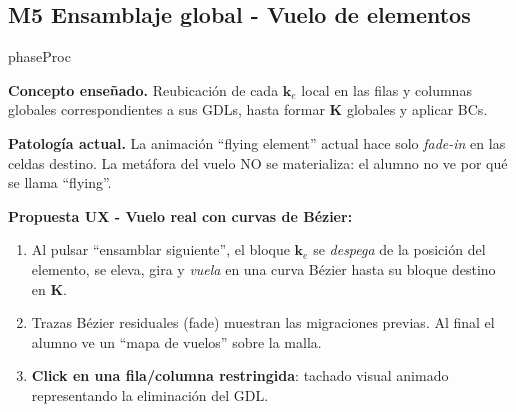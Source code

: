 \documentclass[11pt,a4paper]{article}
\begin{document}
\subsection{M5 \textbar{} Ensamblaje global - Vuelo de elementos}

\begin{moduleBox}{phaseProc}

\textbf{Concepto enseñado.} Reubicación de cada $\mathbf{k}_e$ local
en las filas y columnas globales correspondientes a sus GDLs, hasta
formar $\mathbf{K}$ globales y aplicar BCs.

\textbf{Patología actual.} La animación ``flying element'' actual hace
solo \emph{fade-in} en las celdas destino. La metáfora del vuelo NO se
materializa: el alumno no ve por qué se llama ``flying''.

\textbf{Propuesta UX - Vuelo real con curvas de Bézier:}
\begin{enumerate}[leftmargin=1.2em, itemsep=2pt]
  \item Al pulsar ``ensamblar siguiente'', el bloque $\mathbf{k}_e$ se
        \emph{despega} de la posición del elemento, se eleva, gira y
        \emph{vuela} en una curva Bézier hasta su bloque destino en
        $\mathbf{K}$.
  \item Trazas Bézier residuales (fade) muestran las migraciones previas.
        Al final el alumno ve un ``mapa de vuelos'' sobre la malla.
  \item \textbf{Click en una fila/columna restringida}: tachado visual
        animado representando la eliminación del GDL.
\end{enumerate}

\begin{center}
\end{center}
\end{moduleBox}
\end{document}
